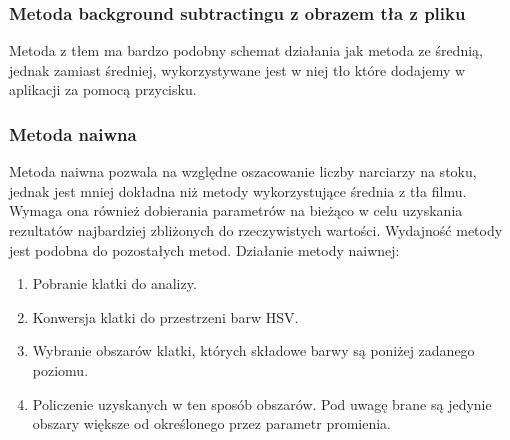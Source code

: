 \documentclass[a4paper]{article}
\begin{document}
\subsubsection{Metoda background subtractingu z obrazem tła z pliku}
Metoda z tłem ma bardzo podobny schemat działania jak metoda ze średnią, jednak zamiast średniej, wykorzystywane jest w niej tło które dodajemy w aplikacji za pomocą przycisku.

\subsubsection{Metoda naiwna}
Metoda naiwna pozwala na względne oszacowanie liczby narciarzy na stoku, jednak jest mniej dokładna niż metody wykorzystujące średnia z tła filmu. Wymaga ona również dobierania parametrów na bieżąco w celu uzyskania rezultatów najbardziej zbliżonych do rzeczywistych wartości. Wydajność metody jest podobna do pozostałych metod. Działanie metody naiwnej:
\begin{enumerate}
\item Pobranie klatki do analizy.
\item Konwersja klatki do przestrzeni barw HSV.
\item Wybranie obszarów klatki, których składowe barwy są poniżej zadanego poziomu.
\item Policzenie uzyskanych w ten sposób obszarów. Pod uwagę brane są jedynie obszary większe od określonego przez parametr promienia.
\end{enumerate}
\end{document}
